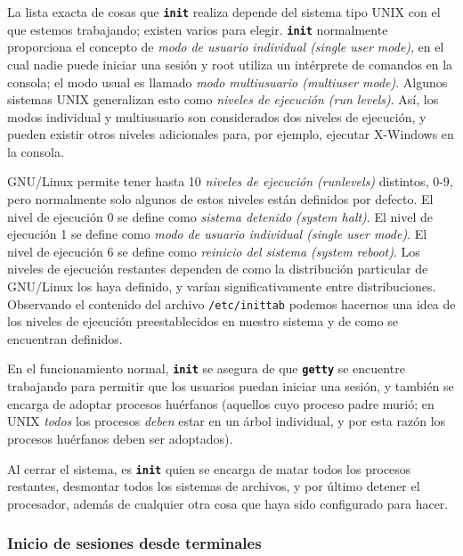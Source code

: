  La lista exacta de cosas que \texttt{\textbf{init}} realiza depende del sistema tipo UNIX
con el que estemos trabajando; existen varios para elegir. \texttt{\textbf{init}} normalmente
proporciona el concepto de \textit{modo de usuario individual (single user mode)}, en el cual nadie puede
iniciar una sesión y root utiliza un intérprete de comandos en la consola; el
modo usual es llamado \textit{modo multiusuario (multiuser mode)}.
Algunos sistemas UNIX generalizan esto
como \textit{niveles de ejecución (run levels)}. Así, los modos individual y
multiusuario son considerados dos niveles de ejecución, y pueden existir otros
niveles adicionales para, por ejemplo, ejecutar X-Windows en la consola.


 GNU/Linux permite tener hasta 10 \textit{niveles de ejecución (runlevels)} distintos, 0-9,
pero normalmente solo algunos de estos niveles están definidos por defecto. El
nivel de ejecución 0 se define como \textit{sistema detenido (system halt)}. El nivel
de ejecución 1 se define como \textit{modo de usuario individual (single user mode)}.
El nivel de ejecución 6 se define como \textit{reinicio del sistema (system reboot)}.
Los niveles de ejecución restantes dependen de como la distribución particular
de GNU/Linux los haya definido, y varían significativamente entre
distribuciones. Observando el contenido del archivo
\texttt{/etc/inittab} podemos hacernos una idea de los niveles de
ejecución preestablecidos en nuestro sistema y de como se encuentran definidos.


 En el funcionamiento normal, \texttt{\textbf{init}} se asegura de que
\texttt{\textbf{getty}} se encuentre trabajando para permitir que los usuarios puedan iniciar una
sesión, y también se encarga de adoptar procesos huérfanos (aquellos cuyo
proceso padre murió; en UNIX \textit{todos} los procesos \textit{deben} estar
en un árbol individual, y por esta razón los procesos huérfanos deben ser
adoptados).  

 Al cerrar el sistema, es \texttt{\textbf{init}} quien se encarga de
matar todos los procesos restantes, desmontar todos los sistemas de archivos, y
por último detener el procesador, además de cualquier otra cosa que haya sido
configurado para hacer.  




\subsubsection{ Inicio de sesiones desde terminales}

